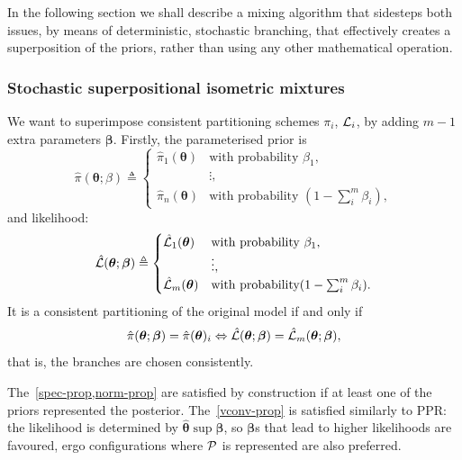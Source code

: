 \documentclass[usenatbib]{mnras}
\begin{document}
In the following section we shall describe a mixing algorithm that
sidesteps both issues, by means of deterministic, stochastic
branching, that effectively creates a superposition of the priors,
rather than using any other mathematical operation.

\subsubsection{Stochastic superpositional isometric mixtures}

We want to superimpose consistent partitioning schemes $\pi_{i}$,
${\cal L}_{i}$, by adding \(m-1\) extra parameters $\bm{\beta}$. 
Firstly, the parameterised prior is 
\begin{equation}
  \hat{\pi}(\bm{\theta}; \beta)  \triangleq
  \begin{cases}
	\hat{\pi}_{1}(\bm{\theta}) & \text{with probability } \beta_{1},\\
	& \vdots,\\
	\hat{\pi}_{n}(\bm{\theta}) & \text{with probability } (1- \sum_{i}^{m}\beta_{i}),
	\end{cases}
\end{equation}
and likelihood:
\begin{equation}
  \hat{\cal L}(\bm{\theta}; \bm{\beta})  \triangleq
  \begin{cases}
	\hat{\cal L}_{1}(\bm{\theta}) &  \text{with probability } \beta_{1},\\
		    &\vdots,\\
	\hat{\cal L}_{m}(\bm{\theta}) & \text{with probability} (1- \sum_{i}^{m}\beta_{i}).
\end{cases}
\end{equation}
It is a consistent partitioning of the original model if and only if
\begin{equation}
  \label{eq:sspr}
  \hat{\pi}(\bm{\theta}; \bm{\beta}) = \hat{\pi}(\bm{\theta})_{i} \Leftrightarrow \hat{\cal L}(\bm{\theta}; \bm{\beta}) = \hat{\cal L}_{m}(\bm{\theta}; \bm{\beta}), 
\end{equation}
that is, the branches are chosen consistently.

The~\cref{spec-prop,norm-prop} are satisfied by construction if at
least one of the priors represented the
posterior. The~\cref{vconv-prop} is satisfied similarly to PPR: the
likelihood is determined by \(\bm\hat{\theta} \sup \bm{\beta}\), so
$\bm{\beta}$s that lead to higher likelihoods are favoured, ergo
configurations where ${\cal P}$ is represented are also preferred.
\end{document}
